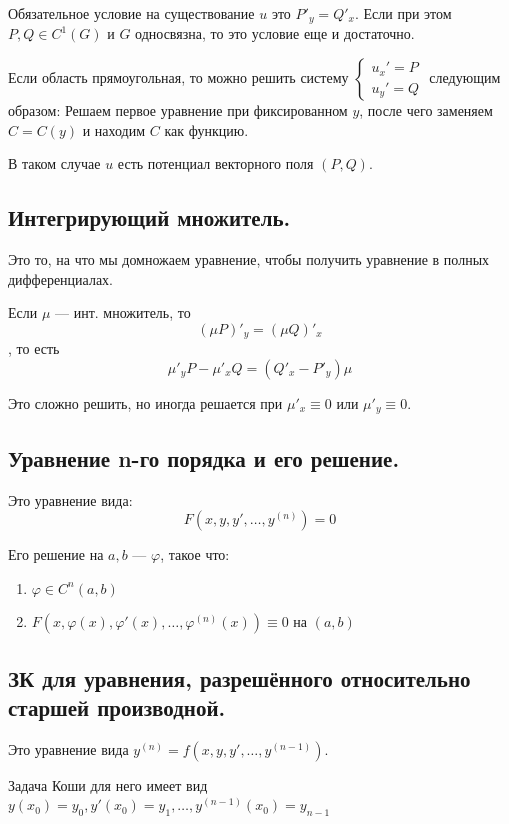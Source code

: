 Обязательное условие на существование \(u\) это \(P'_y = Q'_x\). Если при этом \(P, Q\in C^1(G)\) и \(G\) односвязна, то это условие еще и достаточно.

Если область прямоугольная, то можно решить систему \(\begin{cases}
    u_x' = P \\
    u_y' = Q
\end{cases}\) следующим образом: Решаем первое уравнение при фиксированном \(y\), после чего заменяем \(C = C(y)\) и находим \(C\) как функцию.

В таком случае \(u\) есть потенциал векторного поля \((P, Q)\).

\subsection*{Интегрирующий множитель.}

Это то, на что мы домножаем уравнение, чтобы получить уравнение в полных дифференциалах.

Если \(\mu\) --- инт. множитель, то
\[(\mu P)'_y = (\mu Q)'_x\]
, то есть
\[\mu'_y P - \mu'_x Q = (Q'_x - P'_y) \mu\]

Это сложно решить, но иногда решается при \(\mu'_x \equiv 0\) или \(\mu'_y \equiv 0\).

\subsection*{Уравнение n-го порядка и его решение.}

Это уравнение вида:
\[F(x, y, y', \dots , y^{(n)}) = 0\]

Его решение на \(a, b\) --- \(\varphi\), такое что:
\begin{enumerate}
    \item \(\varphi\in C^n(a, b)\)
    \item \(F(x, \varphi(x), \varphi'(x), \dots , \varphi^{(n)}(x)) \equiv 0\) на \((a, b)\)
\end{enumerate}

\subsection*{ЗК для уравнения, разрешённого относительно старшей производной.}

Это уравнение вида \(y^{(n)} = f(x, y, y', \dots , y^{(n - 1)})\).

Задача Коши для него имеет вид \(y(x_0) = y_0, y'(x_0) = y_1, \dots , y^{(n - 1)}(x_0) = y_{n - 1}\)

